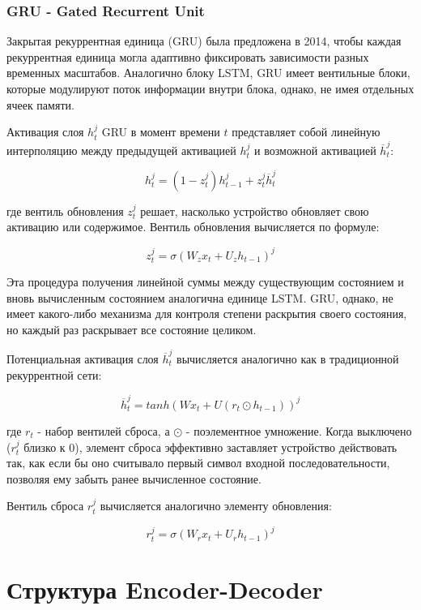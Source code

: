 \documentclass[a4paper,russian]{article}
\begin{document}
	\clearpage
	
	\subsubsection{GRU - Gated Recurrent Unit}
	
	Закрытая рекуррентная единица (GRU) была предложена в 2014, чтобы каждая рекуррентная единица
	могла адаптивно фиксировать зависимости разных временных масштабов. Аналогично блоку LSTM, GRU имеет
	вентильные блоки, которые модулируют поток информации внутри блока, однако, не имея отдельных
	ячеек памяти.
	
	Активация слоя $h^{j}_{t}$ GRU в момент времени $t$ представляет собой линейную интерполяцию между предыдущей активацией $h^{j}_{t}$ и возможной активацией $\overline{h}^{j}_{t}$:
	
	$$ h^{j}_{t} = (1 - z^{j}_{t})h^{j}_{t - 1} + z^{j}_{t} \overline{h}^{j}_{t} $$
	
	где вентиль обновления $z^{j}_{t}$ решает, насколько устройство обновляет свою активацию или содержимое. Вентиль обновления вычисляется по формуле:
	
 	$$ z^{j}_{t} = \sigma(W_z x_t + U_z h_{t - 1})^j $$

	Эта процедура получения линейной суммы между существующим состоянием и вновь вычисленным состоянием аналогична единице LSTM. GRU, однако, не имеет какого-либо механизма для контроля степени раскрытия своего состояния, но каждый раз раскрывает все состояние целиком.
	
	Потенциальная активация слоя $\overline{h}^{j}_{t}$ вычисляется аналогично как в традиционной рекуррентной сети:
	
	$$ \overline{h}^{j}_{t} = tanh(W x_t + U(r_t \odot h_{t - 1}))^j $$
	
	где $r_t$ - набор вентилей сброса, а $\odot$ - поэлементное умножение. Когда выключено ($r^{j}_{t}$ близко к 0), элемент сброса эффективно заставляет устройство действовать так, как если бы оно считывало первый символ входной последовательности, позволяя ему забыть ранее вычисленное состояние.
	
	Вентиль сброса $r^{j}_{t}$ вычисляется аналогично элементу обновления:
	
	$$ r^{j}_{t} = \sigma(W_r x_t + U_r h_{t - 1})^j $$
	
 	\clearpage
	
	\section{Структура Encoder-Decoder}
	
\end{document}
